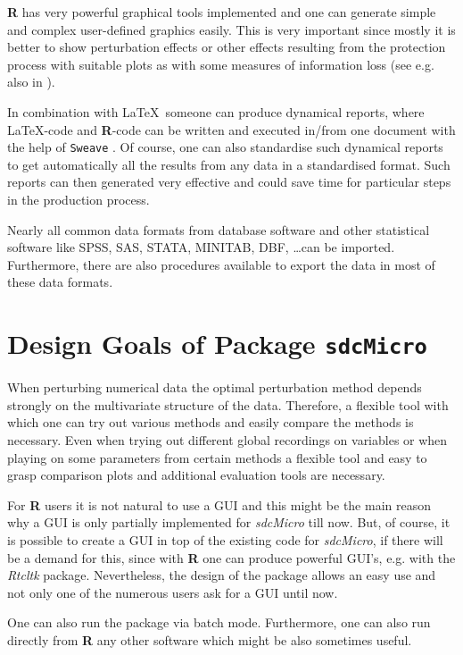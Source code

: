 \documentclass[12pt]{article}
\begin{document}
{\bf R} has very powerful graphical tools implemented and one can generate simple and complex user-defined graphics easily. This is very important since mostly it is better to show perturbation effects or other effects resulting from the protection process with suitable plots as with some measures of information loss (see e.g. also in \cite{Templ06}).

In combination with \LaTeX \ someone can produce dynamical reports, where \LaTeX -code and {\bf R}-code can be written and executed in/from one document with the help of {\tt Sweave} \cite{Leisch02}. Of course, one can also standardise such dynamical reports to get automatically all the results from any data in a standardised format. Such reports can then generated very effective and could save time for particular steps in the production process.

Nearly all common data formats from database software and other statistical software like SPSS, SAS, STATA, MINITAB, DBF, \ldots can be imported. Furthermore, there are also procedures available to export the data in most of these data formats. 

\section{Design Goals of Package {\tt sdcMicro}}

When perturbing numerical data the optimal perturbation method depends strongly on the multivariate structure of the data. Therefore, a flexible tool with which one can try out various methods and easily compare the methods is necessary. Even when trying out different global recordings on variables or when playing on some parameters from certain methods a flexible tool and easy to grasp comparison plots and additional evaluation tools are necessary.

For {\bf R} users it is not natural to use a GUI and this might be the main reason why a GUI is only partially implemented for {\it sdcMicro} till now. But, of course,  it is  possible to create a GUI in top of the existing code for {\it sdcMicro}, if there will be a demand for this, since with {\bf R} one can produce powerful GUI's, e.g. with the {\it Rtcltk} package. Nevertheless, the design of the package allows an easy use and not only one of the numerous users ask for a GUI until now.

One can also run the package via batch mode. Furthermore, one can also run directly from {\bf R} any other software which might be also sometimes useful.
\end{document}
